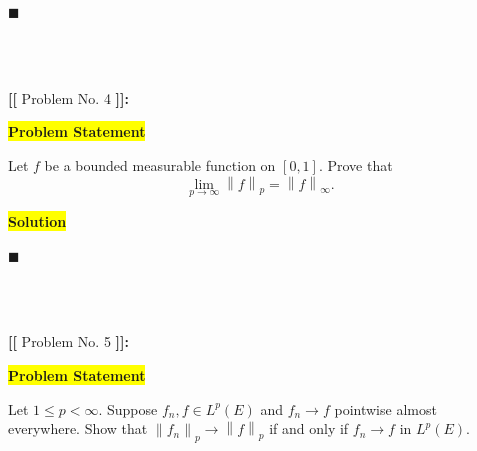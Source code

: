 \documentclass[12pt]{article}
\newcommand\norm[1]{\left\lVert#1\right\rVert}
\newcommand{\mybox}{%
    \collectbox{%
        \setlength{\fboxsep}{2pt}%
        \fbox{\BOXCONTENT}%
    }%
}
\begin{document}
\hfill$\blacksquare$

\vfill

\begin{center}
\\
\vspace{2mm}
\vspace{-0.65cm}
\hrulefill \\
\vspace{-0.95cm}
\hrulefill
\end{center}

\pagebreak

\noindent \textbf{{\huge [}{\Large [}} Problem No. 4 \textbf{{\Large ]}{\huge ]}}{\Large \textbf{:}}

\vspace{3mm}

\noindent\mybox{\colorbox{yellow}{\textbf{Problem Statement}}}\hspace{3mm}\hrulefill 

\noindent Let $f$ be a bounded measurable function on $[0,1]$. Prove that $$\lim\limits_{p\rightarrow\infty} \norm{f}_p = \norm{f}_{\infty}.$$

\vspace{5mm}

\noindent\mybox{\colorbox{yellow}{\textbf{Solution}}}\hspace{3mm}\hrulefill

\noindent 

\hfill$\blacksquare$

\vfill

\begin{center}
\\
\vspace{2mm}
\vspace{-0.65cm}
\hrulefill \\
\vspace{-0.95cm}
\hrulefill
\end{center}

\pagebreak

\noindent \textbf{{\huge [}{\Large [}} Problem No. 5 \textbf{{\Large ]}{\huge ]}}{\Large \textbf{:}}

\vspace{3mm}

\noindent\mybox{\colorbox{yellow}{\textbf{Problem Statement}}}\hspace{3mm}\hrulefill 

\noindent Let $1\leq p < \infty$. Suppose $f_n, f\in L^p(E)$ and $f_n\rightarrow f$ pointwise almost everywhere. Show that $\norm{f_n}_p\rightarrow \norm{f}_p$ if and only if $f_n\rightarrow f$ in $L^p(E)$.
\end{document}
